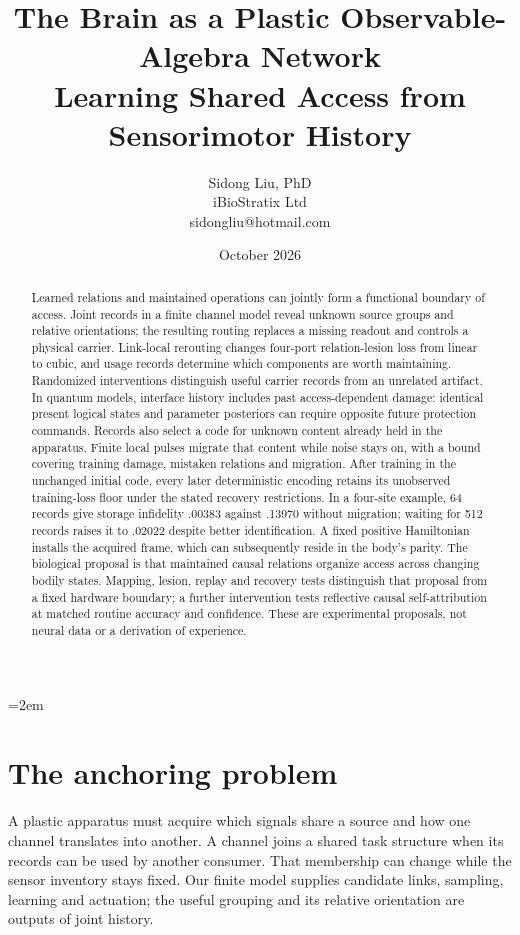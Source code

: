 \documentclass[11pt]{article}
\title{The Brain as a Plastic Observable-Algebra Network\\[3pt]
\large Learning Shared Access from Sensorimotor History}
\author{Sidong Liu, PhD\\\small iBioStratix Ltd\\\small sidongliu@hotmail.com}
\date{October 2026}
\theoremstyle{definition}
\theoremstyle{remark}
\begin{document}
\emergencystretch=2em
\raggedbottom
\maketitle

\begin{abstract}
Learned relations and maintained operations can jointly form a functional boundary of access. Joint records in a finite channel model reveal unknown source groups and relative orientations; the resulting routing replaces a missing readout and controls a physical carrier. Link-local rerouting changes four-port relation-lesion loss from linear to cubic, and usage records determine which components are worth maintaining. Randomized interventions distinguish useful carrier records from an unrelated artifact. In quantum models, interface history includes past access-dependent damage: identical present logical states and parameter posteriors can require opposite future protection commands. Records also select a code for unknown content already held in the apparatus. Finite local pulses migrate that content while noise stays on, with a bound covering training damage, mistaken relations and migration. After training in the unchanged initial code, every later deterministic encoding retains its unobserved training-loss floor under the stated recovery restrictions. In a four-site example, 64 records give storage infidelity .00383 against .13970 without migration; waiting for 512 records raises it to .02022 despite better identification. A fixed positive Hamiltonian installs the acquired frame, which can subsequently reside in the body's parity. The biological proposal is that maintained causal relations organize access across changing bodily states. Mapping, lesion, replay and recovery tests distinguish that proposal from a fixed hardware boundary; a further intervention tests reflective causal self-attribution at matched routine accuracy and confidence. These are experimental proposals, not neural data or a derivation of experience.
\end{abstract}

\section{The anchoring problem}

A plastic apparatus must acquire which signals share a source and how one channel translates into another. A channel joins a shared task structure when its records can be used by another consumer. That membership can change while the sensor inventory stays fixed. Our finite model supplies candidate links, sampling, learning and actuation; the useful grouping and its relative orientation are outputs of joint history.
\end{document}
